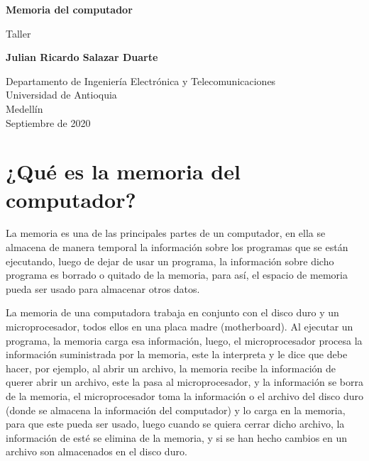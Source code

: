 \documentclass{article}
\begin{document}
\begin{titlepage}
    \begin{center}
        \vspace*{1cm}
            
        \Huge
        \textbf{Memoria del computador}
            
        \vspace{0.5cm}
        \LARGE
        Taller
            
        \vspace{1.5cm}
            
        \textbf{Julian Ricardo Salazar Duarte}
            
        \vfill
            
        \vspace{0.8cm}
            
        \Large
        Departamento de Ingeniería Electrónica y Telecomunicaciones\\
        Universidad de Antioquia\\
        Medellín\\
        Septiembre de 2020
            
    \end{center}
\end{titlepage}

\tableofcontents

\newpage

\section{¿Qué es la memoria del computador?}
La memoria es una de las principales partes de un computador, en ella se almacena de manera temporal la información sobre los programas que se están ejecutando, luego de dejar de usar un programa, la información sobre dicho programa es borrado o quitado de la memoria, para así, el espacio de memoria pueda ser usado para almacenar otros datos.
\vspace{0.5cm}

La memoria de una computadora trabaja en conjunto con el disco duro y un microprocesador, todos ellos en una placa madre (motherboard). Al ejecutar un programa, la memoria carga esa información, luego, el microprocesador procesa la información suministrada por la memoria, este la interpreta y le dice que debe hacer, por ejemplo, al abrir un archivo, la memoria recibe la información de querer abrir un archivo, este la pasa al microprocesador, y la información se borra de la memoria, el microprocesador toma la información o el archivo del disco duro (donde se almacena la información del computador) y lo carga en la memoria, para que este pueda ser usado, luego cuando se quiera cerrar dicho archivo, la información de esté se elimina de la memoria, y si se han hecho cambios en un archivo son almacenados en el disco duro.\cite{Salazar}
\end{document}
